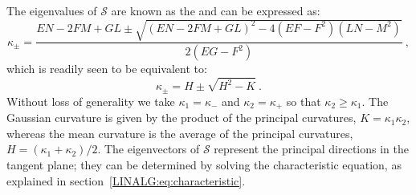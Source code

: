 The eigenvalues of $\mathcal{S}$ are known as the  and can be expressed as:
\[
	\kappa_{\pm} = \frac{EN-2 F M+G L\pm\sqrt{(E N-2 F M+G L)^2-4 \left(EF-F^2\right) \left(LN-M^2\right)}}{2\left(EG-F^2\right)}\ ,
\]
which is readily seen to be equivalent to:
\begin{equation}
	\kappa_{\pm} = H\pm\sqrt{H^2-K}\ .\label{\chabbr:eq:principalcurvature}
\end{equation}
Without loss of generality we take $\kappa_1=\kappa_-$ and $\kappa_2=\kappa_+$ so that $\kappa_2\ge \kappa_1$.  The Gaussian curvature is given by the product of the principal curvatures, $K=\kappa_1\kappa_2$, whereas the mean curvature is the average of the principal curvatures, $H=(\kappa_1+\kappa_2)/2$.  The eigenvectors of $\mathcal{S}$ represent the principal directions in the tangent plane; they can be determined by solving the characteristic equation, as explained in section~\ref{LINALG:eq:characteristic}.

